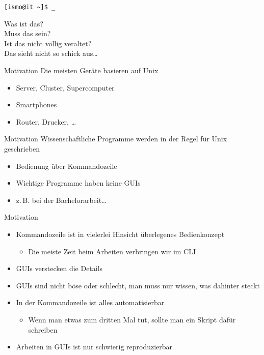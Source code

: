 \tabulinesep=4pt

{
  \color{white}

  \begin{frame}
    \verb+[ismo@it ~]$ _+
\end{frame}
}

\begin{frame}
  \centering
  \Huge
  Was ist das? \\[1em]

  Muss das sein? \\[1em]

  Ist das nicht völlig veraltet? \\[1em]

  Das sieht nicht so schick aus…
\end{frame}

\begin{frame}{Motivation}
  Die meisten Geräte basieren auf Unix
  \begin{itemize}
    \item Server, Cluster, Supercomputer
    \item Smartphones
    \item Router, Drucker, …
  \end{itemize}
\end{frame}

\begin{frame}{Motivation}
  Wissenschaftliche Programme werden in der Regel für Unix geschrieben
  \begin{itemize}
    \item Bedienung über Kommandozeile
    \item Wichtige Programme haben keine GUIs
    \item z.\,B. bei der Bachelorarbeit…
  \end{itemize}
\end{frame}

\begin{frame}{Motivation}
  \begin{itemize}
    \item Kommandozeile ist in vielerlei Hinsicht überlegenes Bedienkonzept
      \begin{itemize}
        \item Die meiste Zeit beim Arbeiten verbringen wir im CLI
      \end{itemize}
    \item GUIs verstecken die Details
    \item GUIs sind nicht böse oder schlecht, man muss nur wissen, was dahinter steckt
    \item In der Kommandozeile ist alles automatisierbar
      \begin{itemize}
        \item Wenn man etwas zum dritten Mal tut, sollte man ein Skript dafür schreiben
      \end{itemize}
    \item Arbeiten in GUIs ist nur schwierig reproduzierbar
  \end{itemize}
\end{frame}

